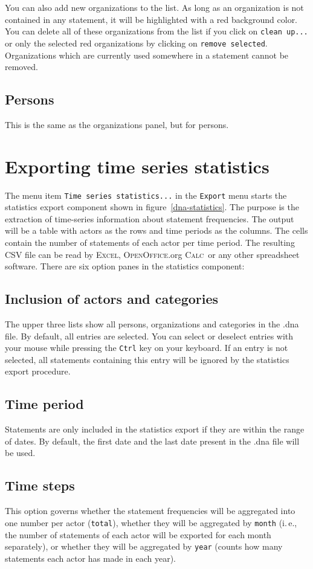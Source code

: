 \documentclass[12pt,a4paper]{scrreprt}
\newcommand{\excel}{\textsc{Excel}}
\newcommand{\calc}{\textsc{OpenOffice}.org \textsc{Calc}}
\newcommand{\code}[1]{\texttt{#1}}
\begin{document}
You can also add new organizations to the list. As long as an organization is not contained in any statement, it will be highlighted with a red background color. You can delete all of these organizations from the list if you click on \code{clean up...} or only the selected red organizations by clicking on \code{remove selected}. Organizations which are currently used somewhere in a statement cannot be removed.

\subsection{Persons}
This is the same as the organizations panel, but for persons.


\section{Exporting time series statistics}\label{statistics}
The menu item \code{Time series statistics...} in the \code{Export} menu starts the statistics export component shown in figure~\ref{dna-statistics}. The purpose is the extraction of time-series information about statement frequencies. The output will be a table with actors as the rows and time periods as the columns. The cells contain the number of statements of each actor per time period. The resulting CSV file can be read by \excel, \calc\ or any other spreadsheet software. There are six option panes in the statistics component:

\subsection{Inclusion of actors and categories}
The upper three lists show all persons, organizations and categories in the .dna file. By default, all entries are selected. You can select or deselect entries with your mouse while pressing the \code{Ctrl} key on your keyboard. If an entry is not selected, all statements containing this entry will be ignored by the statistics export procedure.

\subsection{Time period}
Statements are only included in the statistics export if they are within the range of dates. By default, the first date and the last date present in the .dna file will be used.

\subsection{Time steps}
This option governs whether the statement frequencies will be aggregated into one number per actor (\code{total}), whether they will be aggregated by \code{month} (i.\,e., the number of statements of each actor will be exported for each month separately), or whether they will be aggregated by \code{year} (counts how many statements each actor has made in each year).
\end{document}
